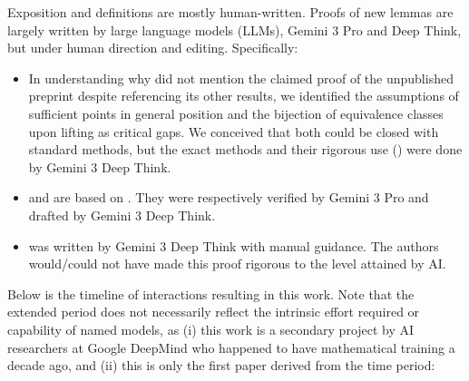 \documentclass[11pt]{article}
\theoremstyle{definition}
\begin{document}
\begin{ai}
Exposition and definitions are mostly human-written. Proofs of new lemmas are largely written by large language models (LLMs), Gemini 3 Pro and Deep Think, but under human direction and editing.
Specifically:
\begin{itemize}
\item In understanding why \cite{manin3} did not mention the claimed proof of the unpublished preprint \cite{dkbrauer} despite referencing its other results, we identified the assumptions of sufficient points in general position and the bijection of equivalence classes upon lifting as critical gaps. We conceived that both could be closed with standard methods, but the exact methods and their rigorous use () were done by Gemini 3 Deep Think.
\item {} and  are based on \cite[Lemma 15-17]{swinnertondyer}. They were respectively verified by Gemini 3 Pro and drafted by Gemini 3 Deep Think.
\item {} was written by Gemini 3 Deep Think with manual guidance. The authors would/could not have made this proof rigorous to the level attained by AI.
\end{itemize}

Below is the timeline of interactions resulting in this work. Note that the extended period does not necessarily reflect the intrinsic effort required or capability of named models, as (i) this work is a secondary project by AI researchers at Google DeepMind who happened to have mathematical training a decade ago, and (ii) this is only the first paper derived from the time period:


\end{ai}
\end{document}
